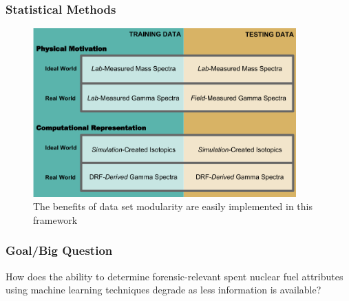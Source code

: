 \begin{frame}
  \frametitle{Statistical Methods}
  \begin{figure}[h!]
    \centering
    \includegraphics[width=0.9\textwidth]{./figures/proposal.png}
    \caption{The benefits of data set modularity are easily implemented in this framework}
  \end{figure}
\end{frame}

\begin{frame}
  \frametitle{Goal/Big Question}
  How does the ability to determine forensic-relevant spent nuclear fuel
  attributes using machine learning techniques degrade as less information is
  available?
\end{frame}
